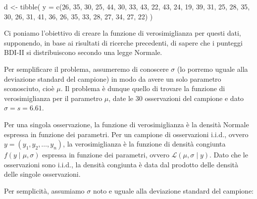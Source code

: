\documentclass[
  10pt,
  italian,
  a4paper,
  extrafontsizes,onecolumn,openright
  ]{memoir}
\newenvironment{Shaded}{\begin{snugshade}}{\end{snugshade}}
\newcommand{\AttributeTok}[1]{\textcolor[rgb]{0.77,0.63,0.00}{#1}}
\newcommand{\CommentTok}[1]{\textcolor[rgb]{0.56,0.35,0.01}{\textit{#1}}}
\newcommand{\DecValTok}[1]{\textcolor[rgb]{0.00,0.00,0.81}{#1}}
\newcommand{\FunctionTok}[1]{\textcolor[rgb]{0.00,0.00,0.00}{#1}}
\newcommand{\NormalTok}[1]{#1}
\newcommand{\OtherTok}[1]{\textcolor[rgb]{0.56,0.35,0.01}{#1}}
\newcommand{\SpecialCharTok}[1]{\textcolor[rgb]{0.00,0.00,0.00}{#1}}
\theoremstyle{definition}
\theoremstyle{definition}
\theoremstyle{definition}
\theoremstyle{definition}
\theoremstyle{remark}
\begin{document}
\begin{Shaded}
\begin{Highlighting}[]
\NormalTok{d }\OtherTok{\textless{}{-}} \FunctionTok{tibble}\NormalTok{(}
  \AttributeTok{y =} \FunctionTok{c}\NormalTok{(}\DecValTok{26}\NormalTok{, }\DecValTok{35}\NormalTok{, }\DecValTok{30}\NormalTok{, }\DecValTok{25}\NormalTok{, }\DecValTok{44}\NormalTok{, }\DecValTok{30}\NormalTok{, }\DecValTok{33}\NormalTok{, }\DecValTok{43}\NormalTok{, }\DecValTok{22}\NormalTok{, }\DecValTok{43}\NormalTok{, }\DecValTok{24}\NormalTok{, }
        \DecValTok{19}\NormalTok{, }\DecValTok{39}\NormalTok{, }\DecValTok{31}\NormalTok{, }\DecValTok{25}\NormalTok{, }\DecValTok{28}\NormalTok{, }\DecValTok{35}\NormalTok{, }\DecValTok{30}\NormalTok{, }\DecValTok{26}\NormalTok{, }\DecValTok{31}\NormalTok{, }\DecValTok{41}\NormalTok{, }\DecValTok{36}\NormalTok{, }
        \DecValTok{26}\NormalTok{, }\DecValTok{35}\NormalTok{, }\DecValTok{33}\NormalTok{, }\DecValTok{28}\NormalTok{, }\DecValTok{27}\NormalTok{, }\DecValTok{34}\NormalTok{, }\DecValTok{27}\NormalTok{, }\DecValTok{22}\NormalTok{)}
\NormalTok{  )}
\end{Highlighting}
\end{Shaded}

Ci poniamo l'obiettivo di creare la funzione di verosimiglianza per questi dati, supponendo, in base ai risultati di ricerche precedenti, di sapere che i punteggi BDI-II si distribuiscono secondo una legge Normale.

Per semplificare il problema, assumeremo di conoscere \(\sigma\) (lo porremo uguale alla deviazione standard del campione) in modo da avere un solo parametro sconosciuto, cioè \(\mu\). Il problema è dunque quello di trovare la funzione di verosimiglianza per il parametro \(\mu\), date le 30 osservazioni del campione e dato \(\sigma = s = 6.61\).

Per una singola osservazione, la funzione di verosimiglianza è la densità Normale espressa in funzione dei parametri. Per un campione di osservazioni i.i.d., ovvero \(y = (y_1, y_2, \dots, y_n)\), la verosimiglianza è la funzione di densità congiunta \(f(y \mid \mu, \sigma)\) espressa in funzione dei parametri, ovvero \(\mathcal{L}(\mu, \sigma \mid y)\). Dato che le osservazioni sono i.i.d., la densità congiunta è data dal prodotto delle densità delle singole osservazioni.

Per semplicità, assumiamo \(\sigma\) noto e uguale alla deviazione standard del campione:

\begin{Shaded}
\end{Shaded}
\end{document}
